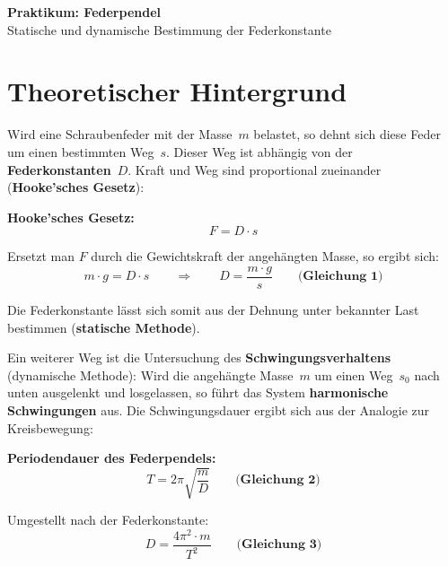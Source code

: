 \documentclass[11pt,a4paper]{scrartcl}
\begin{document}
\begin{center}
	{\LARGE\bfseries Praktikum: Federpendel}\\[0.5cm]
	{\large Statische und dynamische Bestimmung der Federkonstante}
\end{center}

\vspace{0.5cm}

\section*{Theoretischer Hintergrund}

Wird eine Schraubenfeder mit der Masse~$m$ belastet, so dehnt sich diese Feder um einen bestimmten Weg~$s$. Dieser Weg ist abhängig von der \textbf{Federkonstanten}~$D$. Kraft und Weg sind proportional zueinander (\textbf{Hooke'sches Gesetz}):

\begin{formelbox}[title={\faIcon{square-root-alt} Statische Bestimmung}]
	\textbf{Hooke'sches Gesetz:}
	\[ F = D \cdot s \]

	Ersetzt man $F$ durch die Gewichtskraft der angehängten Masse, so ergibt sich:
	\[ m \cdot g = D \cdot s \qquad \Rightarrow \qquad D = \frac{m \cdot g}{s} \qquad \textbf{(Gleichung 1)}\]
\end{formelbox}

Die Federkonstante lässt sich somit aus der Dehnung unter bekannter Last bestimmen (\textbf{statische Methode}).

\vspace{0.3cm}

Ein weiterer Weg ist die Untersuchung des \textbf{Schwingungsverhaltens} (dynamische Methode): Wird die angehängte Masse~$m$ um einen Weg~$s_0$ nach unten ausgelenkt und losgelassen, so führt das System \textbf{harmonische Schwingungen} aus. Die Schwingungsdauer ergibt sich aus der Analogie zur Kreisbewegung:

\begin{formelbox}[title={\faIcon{square-root-alt} Dynamische Bestimmung}]
	\textbf{Periodendauer des Federpendels:}
	\[ T = 2\pi \sqrt{\frac{m}{D}} \qquad \textbf{(Gleichung 2)} \]

	Umgestellt nach der Federkonstante:
	\[ D = \frac{4\pi^2 \cdot m}{T^2} \qquad \textbf{(Gleichung 3)} \]
\end{formelbox}
\end{document}

